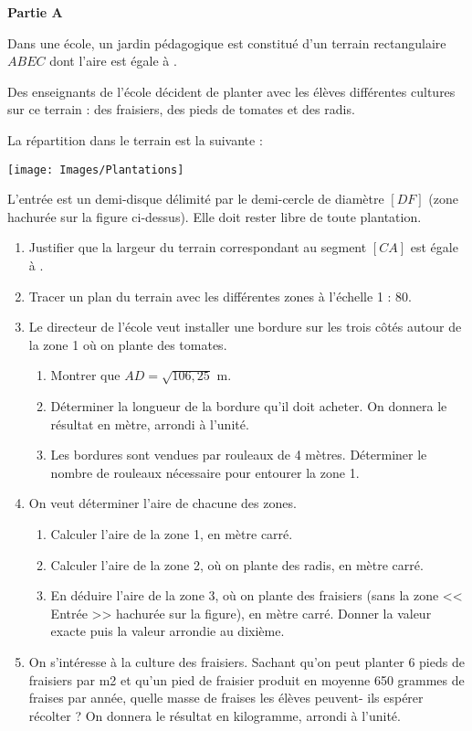 \vskip3mm
   {\bf Partie A} \par \smallskip
   Dans une école, un jardin pédagogique est constitué d’un terrain rectangulaire $ABEC$ dont l’aire est égale à . \par \smallskip
   Des enseignants de l’école décident de planter avec les élèves différentes cultures sur ce terrain : des fraisiers, des pieds de tomates et des radis. \par
   La répartition dans le terrain est la suivante :
   \begin{center}
      \texttt{[image: Images/Plantations]}
   \end{center}
   L’entrée est un demi-disque délimité par le demi-cercle de diamètre $[DF]$ (zone hachurée sur la figure ci-dessus). Elle doit rester libre de toute plantation.
   \begin{enumerate}
      \setlength{\itemsep}{-1mm}
      \item Justifier que la largeur du terrain correspondant au segment $[CA]$ est égale à .
      \item Tracer un plan du terrain avec les différentes zones à l’échelle 1 : 80.
      \item Le directeur de l’école veut installer une bordure sur les trois côtés autour de la zone 1 où on plante des tomates.
         \begin{enumerate}
            \setlength{\itemsep}{-1mm}
            \item Montrer que $AD =\sqrt{106,25}$ m.
            \item Déterminer la longueur de la bordure qu’il doit acheter. On donnera le résultat en mètre, arrondi à l’unité.
            \item Les bordures sont vendues par rouleaux de 4 mètres. Déterminer le nombre de rouleaux nécessaire pour entourer la zone 1.
         \end{enumerate}
      \item On veut déterminer l’aire de chacune des zones.
         \begin{enumerate}
            \setlength{\itemsep}{-1mm}
            \item Calculer l’aire de la zone 1, en mètre carré.
            \item Calculer l’aire de la zone 2, où on plante des radis, en mètre carré.
            \item En déduire l’aire de la zone 3, où on plante des fraisiers (sans la zone << Entrée >> hachurée sur la figure), en mètre carré. Donner la valeur exacte puis la valeur arrondie au dixième.
         \end{enumerate}
      \item On s’intéresse à la culture des fraisiers. Sachant qu’on peut planter 6 pieds de fraisiers par m2 et qu’un pied de fraisier produit en moyenne 650 grammes de fraises par année, quelle masse de fraises les élèves peuvent- ils espérer récolter ? On donnera le résultat en kilogramme, arrondi à l’unité.
   \end{enumerate}

